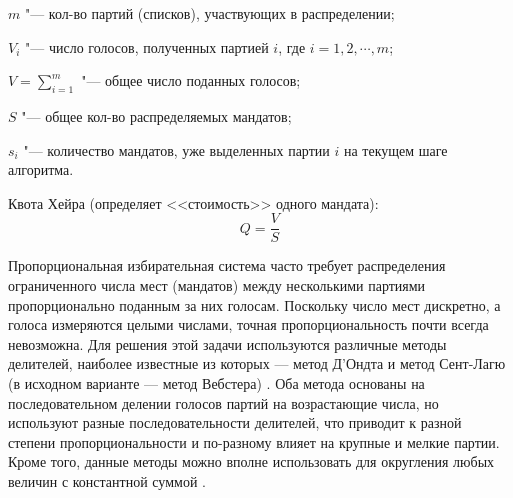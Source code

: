 \documentclass[otchet]{SCWorks}
\begin{document}

\date{2026}

\maketitle

\secNumbering

\tableofcontents

\abbreviations
\begin{description}
     \item $m$ "--- кол-во партий (списков), участвующих в распределении;
     \item $V_i$ "---  число голосов, полученных партией $i$, где $i = 1, 2, \cdots,m$;
     \item $V = \sum_{i = 1}^{m}$ "--- общее число поданных голосов;
     \item $S$ "--- общее кол-во распределяемых мандатов;
     \item $s_i$ "---  количество мандатов, уже выделенных партии $i$ на текущем шаге алгоритма.
     
     Квота Хейра (определяет <<стоимость>> одного мандата): 
     \begin{equation*}
         Q = \frac{V}{S}
     \end{equation*}
\end{description}



\intro
Пропорциональная избирательная система часто требует распределения ограниченного числа мест (мандатов) между несколькими партиями пропорционально поданным за них голосам. Поскольку число мест дискретно, а голоса измеряются целыми числами, точная пропорциональность почти всегда невозможна. Для решения этой задачи используются различные методы делителей, наиболее известные из которых — метод Д’Ондта и метод Сент-Лагю (в исходном варианте — метод Вебстера) \cite{balfair,puke}. Оба метода основаны на последовательном делении голосов партий на возрастающие числа, но используют разные последовательности делителей, что приводит к разной степени пропорциональности и по-разному влияет на крупные и мелкие партии. Кроме того, данные методы можно вполне использовать для округления любых величин с константной суммой \cite{gallprop}.
\end{document}
